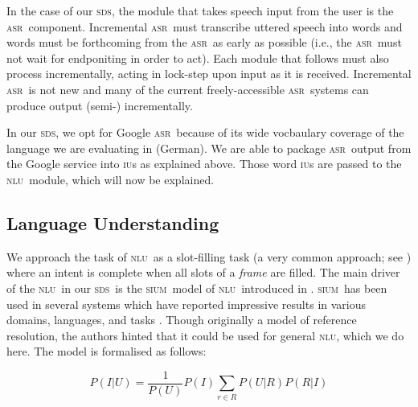 \documentclass[11pt]{article}
\newcommand{\sds}[0]{\textsc{sds}}
\newcommand{\nlu}[0]{\textsc{nlu}}
\newcommand{\sium}[0]{\textsc{sium}}
\newcommand{\asr}[0]{\textsc{asr}}
\newcommand{\iu}[0]{\textsc{iu}}
\begin{document}
In the case of our \sds, the module that takes speech input from the user is the \asr\ component. Incremental \asr\ must transcribe uttered speech into words and words must be forthcoming from the \asr\ as early as possible (i.e., the \asr\ must not wait for endponiting in order to act). Each module that follows must also process incrementally, acting in lock-step upon input as it is received. Incremental \asr\ is not new \cite{baumannetal2009:naacl} and many of the current freely-accessible \asr\ systems can produce output (semi-) incrementally. 

In our \sds, we opt for Google \asr\ because of its wide vocbaulary coverage of the language we are evaluating in (German). We are able to package \asr\ output from the Google service into \iu s as explained above. Those word \iu s are passed to the \nlu\ module, which will now be explained. 

\subsection{Language Understanding}

We approach the task of \nlu\ as a slot-filling task (a very common approach; see ) where an intent is complete when all slots of a \emph{frame} are filled. The main driver of the \nlu\ in our \sds\ is the \sium\ model of \nlu\ introduced in . \sium\ has been used in several systems which have reported impressive results in various domains, languages, and tasks \cite{Kennington2014_coling,Kennington2015_naacl}. Though originally a model of reference resolution, the authors hinted that it could be used for general \nlu, which we do here. The model is formalised as follows:

\begin{center}
\begin{equation}
   P(I|U) = \frac{1}{P(U)} P(I)\sum_{r\in R} P(U|R)P(R|I) 
\label{eq:disc1}
\end{equation}
\end{center}
\end{document}
